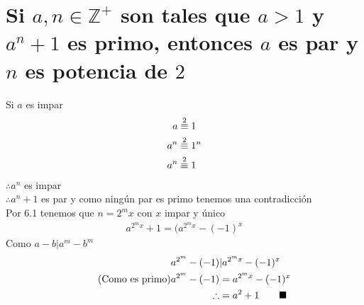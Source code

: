 \section{Si $a,n \in \mathbb{Z}^+$ son tales que $a>1$ y $a^n+1$ es primo, entonces $a$ es par y $n$ es potencia de $2$}
    Si $a$ es impar 
    \begin{align}
        \notag a &\stackrel{2}{\equiv} 1 \\
        \notag a^n &\stackrel{2}{\equiv}1^n \\
        \notag a^n &\stackrel{2}{\equiv}1 \\
    \end{align}
    $\therefore a^n $ es impar \\
    $\therefore a^n +1$ es par y como ningún par es primo tenemos una contradicción \\
    Por 6.1 tenemos que $n=2^{m}x$ con $x$ impar y único
    \begin{align}
        \tag{Porque $x$ es impar} a^{2^{m}x}+1 = (a^{2^{m}x} - (-1)^x
    \end{align}
    Como $a-b|a^m-b^m$
    \begin{align}
        \notag a^{2^m}-(-1)&|a^{2^mx}-(-1)^x \\
        \tag{Como es primo} a^{2^m}-(-1) &= a^{2^mx}-(-1)^x \\
        \therefore &= a^2 +1 \qquad \blacksquare
    \end{align}